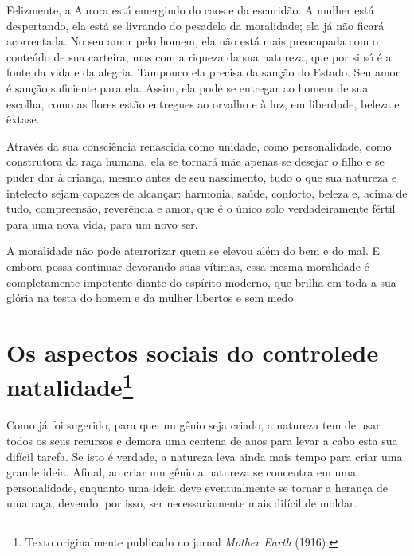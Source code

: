 Felizmente, a Aurora está emergindo do caos e da escuridão. A mulher
está despertando, ela está se livrando do pesadelo da moralidade; ela já
não ficará acorrentada. No seu amor pelo homem, ela não está mais
preocupada com o conteúdo de sua carteira, mas com a riqueza da sua
natureza, que por si só é a fonte da vida e da alegria. Tampouco ela
precisa da sanção do Estado. Seu amor é sanção suficiente para ela.
Assim, ela pode se entregar ao homem de sua escolha, como as flores
estão entregues ao orvalho e à luz, em liberdade, beleza e êxtase.

Através da sua consciência renascida como unidade, como personalidade,
como construtora da raça humana, ela se tornará mãe apenas se desejar o
filho e se puder dar à criança, mesmo antes de seu nascimento, tudo o
que sua natureza e intelecto sejam capazes de alcançar: harmonia, saúde,
conforto, beleza e, acima de tudo, compreensão, reverência e amor, que é
o único solo verdadeiramente fértil para uma nova vida, para um novo
ser.

A moralidade não pode aterrorizar quem se elevou além do bem e do mal. E
embora possa continuar devorando suas vítimas, essa mesma moralidade é
completamente impotente diante do espírito moderno, que brilha em toda a
sua glória na testa do homem e da mulher libertos e sem medo.

\chapter[Os aspectos sociais do controle de natalidade]{Os aspectos sociais do controle\break de natalidade\footnote{Texto
  originalmente publicado no jornal \emph{Mother Earth} (1916).}}

Como já foi sugerido, para que um gênio seja criado, a natureza tem de
usar todos os seus recursos e demora uma centena de anos para levar a
cabo esta sua difícil tarefa. Se isto é verdade, a natureza leva ainda
mais tempo para criar uma grande ideia. Afinal, ao criar um gênio a
natureza se concentra em uma personalidade, enquanto uma ideia deve
eventualmente se tornar a herança de uma raça, devendo, por isso, ser
necessariamente mais difícil de moldar.

